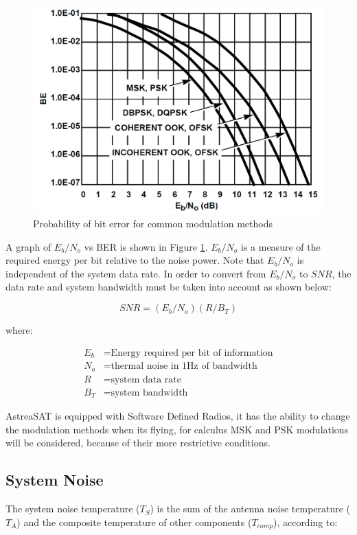 \begin{figure}[H]
	\includegraphics[scale=0.3]{./sections/SatelliteDept/sections/images/BEvsSNR}
	\centering
	\caption{Probability of bit error for common modulation methods \cite{Note1998}}
	\label{BEvsSNR}
\end{figure}

A graph of $E_b/N_o$ vs BER is shown in Figure \ref{BEvsSNR}. $E_b/N_o$ is a measure of the required energy per bit relative to the noise power. Note that $E_b/N_o$ is independent of the system data rate. In order to convert from $E_b/N_o$ to $SNR$, the data rate and system bandwidth must be taken into account as shown below:

\begin{equation}
SNR=(E_b/N_o)(R/B_T)
\label{SNReq}
\end{equation}

where:

\begin{align*}
	E_b&= \text{Energy required per bit of information}\\
	N_o&= \text{thermal noise in 1Hz of bandwidth}\\
	R&= \text{system data rate}\\
	B_T&= \text{system bandwidth}
\end{align*}

AstreaSAT is equipped with Software Defined Radios, it has the ability to change the modulation methods when its flying, for calculus MSK and PSK modulations will be considered, because of their more restrictive conditions.

\subsection{System Noise}
The system noise temperature ($T_S$) is the sum of the antenna noise temperature ($T_A$) and the composite temperature of other components ($T_{comp}$), according to:    \cite{Jorge2012}

